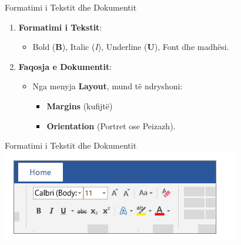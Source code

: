\documentclass[
  ignorenonframetext,
]{beamer}
\providecommand{\tightlist}{%
  \setlength{\itemsep}{0pt}\setlength{\parskip}{0pt}}
\begin{document}
\begin{frame}{Formatimi i Tekstit dhe Dokumentit}
\label{formatimi-i-tekstit-dhe-dokumentit}
\begin{enumerate}
\item
  \textbf{Formatimi i Tekstit}:

  \begin{itemize}
  \tightlist
  \item
    Bold (\textbf{B}), Italic (\emph{I}), Underline (\textbf{U}), Font
    dhe madhësi.
  \end{itemize}
\item
  \textbf{Faqosja e Dokumentit}:

  \begin{itemize}
  \item
    Nga menyja \textbf{Layout}, mund të ndryshoni:

    \begin{itemize}
    \item
      \textbf{Margins} (kufijtë)
    \item
      \textbf{Orientation} (Portret ose Peizazh).
    \end{itemize}
  \end{itemize}
\end{enumerate}
\end{frame}

\begin{frame}{Formatimi i Tekstit dhe Dokumentit}
\label{formatimi-i-tekstit-dhe-dokumentit-1}
\includegraphics{./images/word23.png}
\end{frame}
\end{document}
